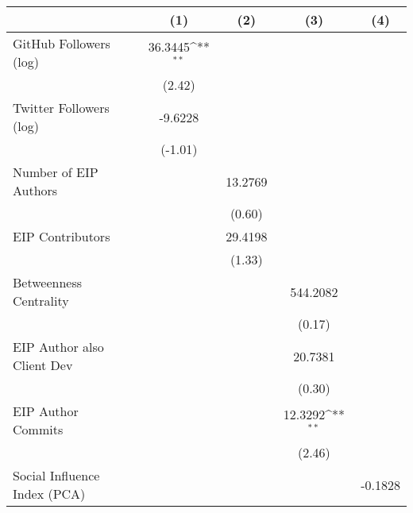 {
\def\sym#1{\ifmmode^{#1}\else\(^{#1}\)\fi}
\begin{tabular}{l*{4}{c}}
\hline\hline
                                   &\multicolumn{1}{c}{(1)}         &\multicolumn{1}{c}{(2)}         &\multicolumn{1}{c}{(3)}         &\multicolumn{1}{c}{(4)}         \\
\hline
GitHub Followers (log)             &   36.3445\sym{**} &                   &                   &                   \\
                                   &    (2.42)         &                   &                   &                   \\
[1em]
Twitter Followers (log)            &   -9.6228         &                   &                   &                   \\
                                   &   (-1.01)         &                   &                   &                   \\
[1em]
Number of EIP Authors              &                   &   13.2769         &                   &                   \\
                                   &                   &    (0.60)         &                   &                   \\
[1em]
EIP Contributors                   &                   &   29.4198         &                   &                   \\
                                   &                   &    (1.33)         &                   &                   \\
[1em]
Betweenness Centrality             &                   &                   &  544.2082         &                   \\
                                   &                   &                   &    (0.17)         &                   \\
[1em]
EIP Author also Client Dev         &                   &                   &   20.7381         &                   \\
                                   &                   &                   &    (0.30)         &                   \\
[1em]
EIP Author Commits                 &                   &                   &   12.3292\sym{**} &                   \\
                                   &                   &                   &    (2.46)         &                   \\
[1em]
Social Influence Index (PCA)       &                   &                   &                   &   -0.1828         \\

\end{tabular}}
